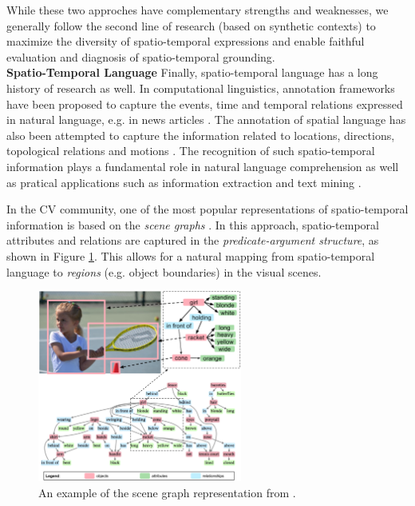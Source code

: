 While these two approches have complementary strengths and weaknesses, we generally follow the second line of research (based on synthetic contexts) to maximize the diversity of spatio-temporal expressions and enable faithful evaluation and diagnosis of spatio-temporal grounding.
\\

\noindent
\textbf{Spatio-Temporal Language}\quad
Finally, spatio-temporal language has a long history of research as well. In computational linguistics, annotation frameworks have been proposed to capture the events, time and temporal relations expressed in natural language, e.g. in news articles \citep{pustejovsky2003timeml,ning-etal-2018-multi}. The annotation of spatial language has also been attempted to capture the information related to locations, directions, topological relations and motions \citep{pustejovsky2011iso,dan-etal-2020-spatial}. The recognition of such spatio-temporal information plays a fundamental role in natural language comprehension \citep{zwaan1998situation} as well as pratical applications such as information extraction and text mining \citep{banko2007,Aggarwal2012MiningTD}.

In the CV community, one of the most popular representations of spatio-temporal information is based on the \textit{scene graphs} \citep{johnson2015image,krishna2017visual}. In this approach, spatio-temporal attributes and relations are captured in the \textit{predicate-argument structure}, as shown in Figure \ref{02_fig:scene_graph}. This allows for a natural mapping from spatio-temporal language to \textit{regions} (e.g. object boundaries) in the visual scenes.

\begin{figure}[t!]
\centering
\includegraphics[width=0.6\textwidth]{scene_graph.pdf}
\caption{An example of the scene graph representation from \citet{johnson2015image}.}
\label{02_fig:scene_graph}
\end{figure}

